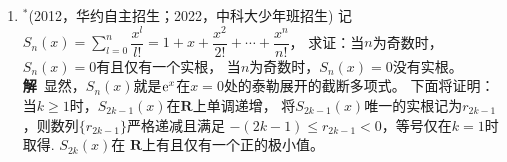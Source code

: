 \begin{enumerate}[label={【\textbf{例\thechapter.\arabic*}】},
 leftmargin=\inteval{\myenumleftmargin}pt,
 itemsep=\inteval{\myenumitempsep}pt,
 itemindent=\inteval{\myenumitemindent}pt]
\textbf{方法二}\ 不妨设$ x\leq a\leq b $，那么$ 0<x\leq 2 $. \\
I.当$ x+a\geq 7 $时，$ b\geq a\geq 5 $，那么
\begin{gather*}
    \dfrac{1}{\sqrt{1+x}}<1,\ \dfrac{1}{\sqrt{1+a}}+\dfrac{1}{\sqrt{1+b}}\leq
    \dfrac{2}{\sqrt{1+5}}<1
\end{gather*}
所以，$ f(x)=\dfrac{1}{\sqrt{1+x}}+\dfrac{1}{\sqrt{1+a}}+\dfrac{1}{\sqrt{1+b}}<2 $. \\
II.当$ x+a<7 $时，
\begin{gather*}
    \dfrac{1}{1+x}=1-\dfrac{x}{1+x}<1-\dfrac{x}{1+x}+\dfrac{x^2}{4(1+x)^2}=\left[
    1-\dfrac{x}{2(1+x)}\right]^2 \\
    \dfrac{1}{\sqrt{1+x}}<1-\dfrac{x}{2(1+x)}
\end{gather*}
同理可得：$ \dfrac{1}{\sqrt{1+a}}<1-\dfrac{a}{2(1+a)} $.于是，
\begin{align*}
    f(x)<2-\dfrac{1}{2}\left(\dfrac{x}{1+x}+\dfrac{a}{1+a}-
    2\sqrt{\dfrac{ax}{ax+8}}\right)
\end{align*}
又因为
\begin{align*}
    \dfrac{x}{1+x}+\dfrac{a}{1+a}\geq 2\sqrt{\dfrac{ax}{(1+x)(1+a)}}
    =2\sqrt{\dfrac{ax}{1+a+x+ax}}>2\sqrt{\dfrac{ax}{ax+8}}
\end{align*}
所以，$ f(x)<2 $成立。

事实上，结论可加强为$ 1<f(x)\leq \sqrt{3} $.当$ x=a=\dfrac{8}{ax}=2 $时，
$ f(x)=\sqrt{3} $. 证明过程参见脚注中的文献\footnote{王品行.2008年高考数学江西理科卷压轴题之别解[J].中学数学研究,2008:24-25.\\ 蒋明斌.一道西部数学奥林匹克赛题的溯源与推广[J].中学数学研究,2006:50-52.\\
    吴善和.关于IMO42一个不等式的逆向[J].中学数学研究,2004:50-50}。
从高等数学角度来讲，实际上是研究二元函数$ F(x,a)=\dfrac{1}{\sqrt{1+x}}+
\dfrac{1}{\sqrt{1+a}}+\sqrt{\dfrac{ax}{ax+8}} $在$ x>0,a>0 $时的极值，
或者是三元函数$ G(x,a,b)=\dfrac{1}{\sqrt{1+x}}+\dfrac{1}{\sqrt{1+a}}+
\dfrac{1}{\sqrt{1+b}} $在约束条件$ xab=8 $下的极值，
可采用拉格朗日未定乘数法，然后求二重极限。

\item $ ^* $(2012，华约自主招生；2022，中科大少年班招生) 记$ S_n(x)=\sum\limits_{l=0}^{n}
\dfrac{x^l}{l!}=1+x+\dfrac{x^2}{2!}+\cdots+\dfrac{x^n}{n!} $，
求证：当$ n $为奇数时，$ S_n(x)=0 $有且仅有一个实根，
当$ n $为奇数时，$ S_n(x)=0 $没有实根。\\
\textbf{解}\ 显然，$ S_n(x) $就是$ \mathrm{e}^x $在$ x=0 $处的泰勒展开的截断多项式。
下面将证明：当$ k\geq 1 $时，$ S_{2k-1}(x) $在$ \textbf{R} $上单调递增，
将$S_{2k-1}(x)$唯一的实根记为$ r_{2k-1}$，则数列$ \{r_{2k-1}\} $严格递减且满足
$ -(2k-1)\leq r_{2k-1} <0 $，等号仅在$ k=1 $时取得. $ S_{2k}(x) $在
$ \textbf{R} $上有且仅有一个正的极小值。


\end{enumerate}
